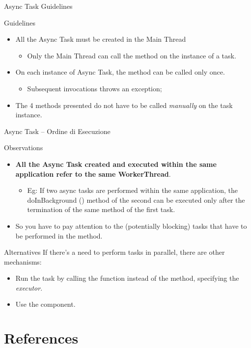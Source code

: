 \documentclass{beamer}
\begin{document}
  \begin{frame}{Async Task Guidelines}
    \begin{block}{Guidelines}
      \begin{itemize}
        \item All the Async Task must be created in the Main Thread
        \begin{itemize}
          \item Only the Main Thread can call the  method on
          the instance of a task.
        \end{itemize}
        \item On each instance of Async Task, the  method can
        be called only once.
        \begin{itemize}
          \item Subsequent invocations throws an exception;
        \end{itemize}
        \item The 4 methods presented do not have to be called \textit{manually}
        on the task instance.
      \end{itemize}
    \end{block}
  \end{frame}


  \begin{frame}{Async Task -- Ordine di Esecuzione}
    \begin{block}{Observations}
      \begin{itemize}
        \item \textbf{All the Async Task created and executed within the same application
        refer to the same WorkerThread}.  
        \begin{itemize}
          \item Eg: \small{If two async tasks are performed within the same
          application, the doInBackground () method of the second can be
          executed only after the termination of the same method of the first
          task.}
        \end{itemize}
        \item So you have to pay attention to the (potentially blocking) tasks
        that have to be performed in the  method.  
      \end{itemize}
    \end{block}
    \begin{block}{Alternatives}
      If there's a need to perform tasks in parallel, there are other
      mechanisms:
      \begin{itemize}
        \item Run the task by calling the  function
        instead of the  method, specifying the \textit{executor}.
        \item Use the  component.
      \end{itemize}
    \end{block}
  \end{frame}

\section*{References}

\end{document}
